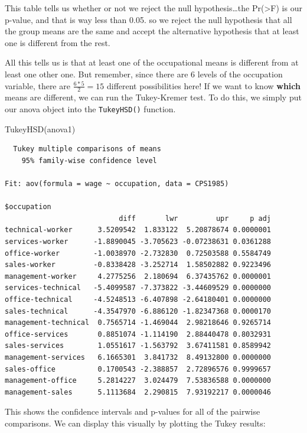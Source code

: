\documentclass[
  letterpaper,
]{book}
\newenvironment{Shaded}{\begin{snugshade}}{\end{snugshade}}
\newcommand{\FunctionTok}[1]{\textcolor[rgb]{0.28,0.35,0.67}{#1}}
\newcommand{\NormalTok}[1]{\textcolor[rgb]{0.00,0.23,0.31}{#1}}
\begin{document}
This table tells us whether or not we reject the null
hypothesis\ldots the Pr(\textgreater F) is our p-value, and that is way
less than 0.05. so we reject the null hypothesis that all the group
means are the same and accept the alternative hypothesis that at least
one is different from the rest.

All this tells us is that at least one of the occupational means is
different from at least one other one. But remember, since there are 6
levels of the occupation variable, there are \(\frac{6*5}{2}=15\)
different possibilities here! If we want to know \textbf{which} means
are different, we can run the Tukey-Kremer test. To do this, we simply
put our anova object into the \texttt{TukeyHSD()} function.

\begin{Shaded}
\begin{Highlighting}[]
\FunctionTok{TukeyHSD}\NormalTok{(anova1)}
\end{Highlighting}
\end{Shaded}

\begin{verbatim}
  Tukey multiple comparisons of means
    95% family-wise confidence level

Fit: aov(formula = wage ~ occupation, data = CPS1985)

$occupation
                           diff       lwr         upr     p adj
technical-worker      3.5209542  1.833122  5.20878674 0.0000001
services-worker      -1.8890045 -3.705623 -0.07238631 0.0361288
office-worker        -1.0038970 -2.732830  0.72503588 0.5584749
sales-worker         -0.8338428 -3.252714  1.58502882 0.9223496
management-worker     4.2775256  2.180694  6.37435762 0.0000001
services-technical   -5.4099587 -7.373822 -3.44609529 0.0000000
office-technical     -4.5248513 -6.407898 -2.64180401 0.0000000
sales-technical      -4.3547970 -6.886120 -1.82347368 0.0000170
management-technical  0.7565714 -1.469044  2.98218646 0.9265714
office-services       0.8851074 -1.114190  2.88440478 0.8032931
sales-services        1.0551617 -1.563792  3.67411581 0.8589942
management-services   6.1665301  3.841732  8.49132800 0.0000000
sales-office          0.1700543 -2.388857  2.72896576 0.9999657
management-office     5.2814227  3.024479  7.53836588 0.0000000
management-sales      5.1113684  2.290815  7.93192217 0.0000046
\end{verbatim}

This shows the confidence intervals and p-values for all of the pairwise
comparisons. We can display this visually by plotting the Tukey results:
\end{document}
